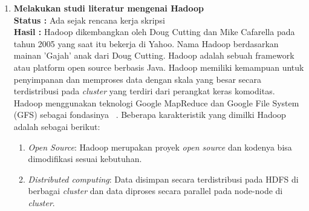 \documentclass[a4paper,twoside]{article}
\begin{document}
\begin{enumerate}
\begin{enumerate}
\end{enumerate}

{\it Big data} sangat bermanfaat ketika diterapkan di berbagai macam bidang seperti bisnis, kesehatan, pemerintahan, pertanian dan lainya. Ketika organisasi mampu menggabungkan jumlah data besar yang dimilikinya dengan analisis bertenaga tinggi, organisasi dapat menyelesaikan tantangan dan masalah yang berhubungan dengan bisnis seperti:

\begin{enumerate}

\item Menentukan akar penyebab kegagalan untuk setiap masalah bisnis.

\item Menghasilkan informasi mengenai titik penting penjualan berdasarkan kebiasaan pelanggan dalam membeli.

\item Menghitung kembali seluruh risiko yang ada dalam waktu yang singkat.

\item Mendeteksi perilaku penipuan yang dapat mempengaruhi organisasi.

\end{enumerate}
		


		\item \textbf{Melakukan studi literatur mengenai Hadoop}\\
		{\bf Status :} Ada sejak rencana kerja skripsi \\
		{\bf Hasil :} Hadoop dikembangkan oleh Doug Cutting dan Mike Cafarella pada tahun 2005 yang saat itu bekerja di Yahoo. Nama Hadoop berdasarkan mainan 'Gajah' anak dari Doug Cutting. Hadoop adalah sebuah framework atau platform open source berbasis Java. Hadoop memiliki kemampuan untuk penyimpanan dan memproses data dengan skala yang besar secara terdistribusi pada {\it cluster} yang terdiri dari perangkat keras komoditas. Hadoop menggunakan teknologi Google MapReduce dan Google File System (GFS) sebagai fondasinya ~\cite{tomwhite:01:htdg}. Beberapa karakteristik yang dimilki Hadoop adalah sebagai berikut:


\begin{enumerate}

\item {\it Open Source}: Hadoop merupakan proyek {\it open source} dan kodenya bisa dimodifikasi sesuai kebutuhan. 

\item {\it Distributed computing}: Data disimpan secara terdistribusi pada HDFS di berbagai {\it cluster} dan data diproses secara parallel pada node-node di {\it cluster}.


\end{enumerate}
\end{enumerate}
\end{document}
